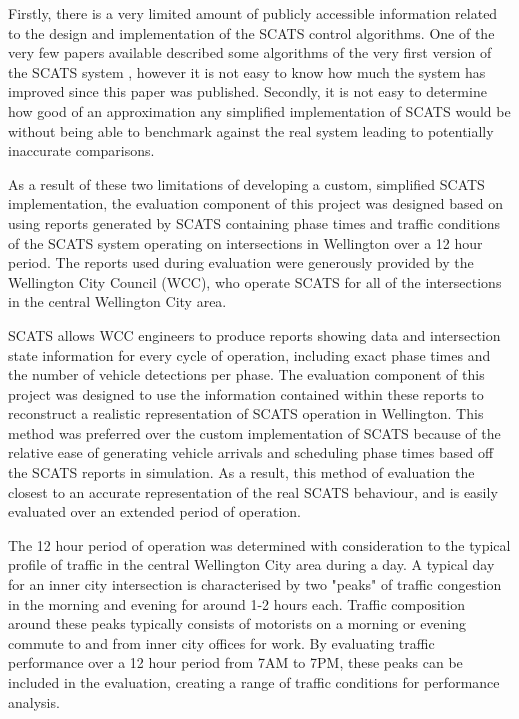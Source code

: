 Firstly, there is a very limited amount of publicly accessible information related to the design and implementation of the SCATS control algorithms. One of the very few papers available described some algorithms of the very first version of the SCATS system , however it is not easy to know how much the system has improved since this paper was published. Secondly, it is not easy to determine how good of an approximation any simplified implementation of SCATS would be without being able to benchmark against the real system leading to potentially inaccurate comparisons. 

As a result of these two limitations of developing a custom, simplified SCATS implementation, the evaluation component of this project was designed based on using reports generated by SCATS containing phase times and traffic conditions of the SCATS system operating on intersections in Wellington over a 12 hour period. The reports used during evaluation were generously provided by the Wellington City Council (WCC), who operate SCATS for all of the intersections in the central Wellington City area. 

SCATS allows WCC engineers to produce reports showing data and intersection state information for every cycle of operation, including exact phase times and the number of vehicle detections per phase. The evaluation component of this project was designed to use the information contained within these reports to reconstruct a realistic representation of SCATS operation in Wellington. This method was preferred over the custom implementation of SCATS because of the relative ease of generating vehicle arrivals and scheduling phase times based off the SCATS reports in simulation. As a result, this method of evaluation the closest to an accurate representation of the real SCATS behaviour, and is easily evaluated over an extended period of operation. 

The 12 hour period of operation was determined with consideration to the typical profile of traffic in the central Wellington City area during a day. A typical day for an inner city intersection is characterised by two "peaks" of traffic congestion in the morning and evening for around 1-2 hours each. Traffic composition around these peaks typically consists of motorists on a morning or evening commute to and from inner city offices for work. By evaluating traffic performance over a 12 hour period from 7AM to 7PM, these peaks can be included in the evaluation, creating a range of traffic conditions for performance analysis. 








